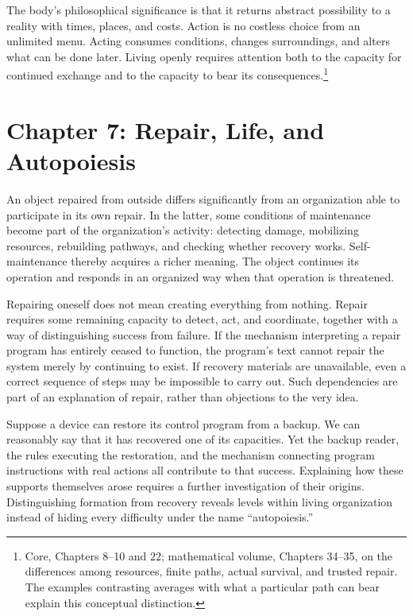 \documentclass[
  english,
  11pt,
  oneside]{book}
\begin{document}
\begingroup{}

The body's philosophical significance is that it returns abstract possibility to a reality with times, places, and costs. Action is no costless choice from an unlimited menu. Acting consumes conditions, changes surroundings, and alters what can be done later. Living openly requires attention both to the capacity for continued exchange and to the capacity to bear its consequences.\footnote{\hypertarget{ph-note-14}{}Core, Chapters 8--10 and 22; mathematical volume, Chapters 34--35, on the differences among resources, finite paths, actual survival, and trusted repair. The examples contrasting averages with what a particular path can bear explain this conceptual distinction.}

\par\endgroup

\chapter{Chapter 7: Repair, Life, and Autopoiesis}\label{ph-ch-07}

An object repaired from outside differs significantly from an organization able to participate in its own repair. In the latter, some conditions of maintenance become part of the organization's activity: detecting damage, mobilizing resources, rebuilding pathways, and checking whether recovery works. Self-maintenance thereby acquires a richer meaning. The object continues its operation and responds in an organized way when that operation is threatened.

Repairing oneself does not mean creating everything from nothing. Repair requires some remaining capacity to detect, act, and coordinate, together with a way of distinguishing success from failure. If the mechanism interpreting a repair program has entirely ceased to function, the program's text cannot repair the system merely by continuing to exist. If recovery materials are unavailable, even a correct sequence of steps may be impossible to carry out. Such dependencies are part of an explanation of repair, rather than objections to the very idea.

Suppose a device can restore its control program from a backup. We can reasonably say that it has recovered one of its capacities. Yet the backup reader, the rules executing the restoration, and the mechanism connecting program instructions with real actions all contribute to that success. Explaining how these supports themselves arose requires a further investigation of their origins. Distinguishing formation from recovery reveals levels within living organization instead of hiding every difficulty under the name ``autopoiesis.''
\end{document}

